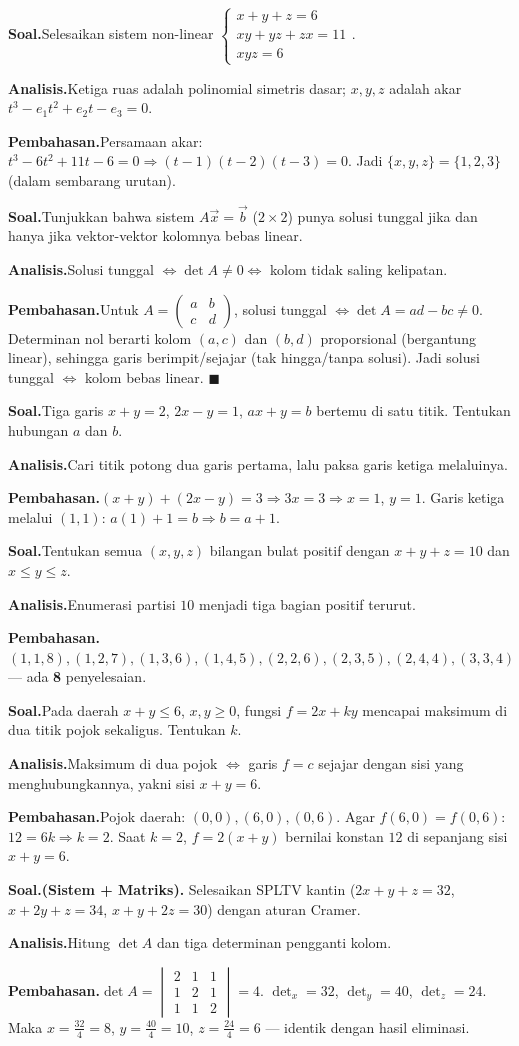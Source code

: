\documentclass[11pt,a4paper]{report}
\theoremstyle{gaya}
\newcommand{\knomor}[1]{\par\medskip\noindent{\bfseries\color{ungu}#1}\par\nopagebreak}
\newcommand{\ksoal}{\noindent\textbf{\color{biru}Soal.}\space}
\newcommand{\kanalisis}{\par\noindent\textbf{\color{oranye}Analisis.}\space}
\newcommand{\kbahas}{\par\noindent\textbf{\color{hijau}Pembahasan.}\space}
\newcommand{\kbagian}[1]{\par\medskip\noindent{\large\bfseries\color{biru}#1}\par\smallskip}
\begin{document}
\kbagian{Bagian C}

\knomor{C.1}
\ksoal Selesaikan sistem non-linear $\begin{cases} x+y+z=6\\ xy+yz+zx=11\\ xyz=6\end{cases}$.
\kanalisis Ketiga ruas adalah polinomial simetris dasar; $x,y,z$ adalah akar $t^3-e_1t^2+e_2t-e_3=0$.
\kbahas Persamaan akar: $t^3-6t^2+11t-6=0\Rightarrow(t-1)(t-2)(t-3)=0$. Jadi $\{x,y,z\}=\{1,2,3\}$ (dalam sembarang urutan).

\knomor{C.2}
\ksoal Tunjukkan bahwa sistem $A\vec x=\vec b$ ($2\times2$) punya solusi tunggal jika dan hanya jika vektor-vektor kolomnya bebas linear.
\kanalisis Solusi tunggal $\iff\det A\neq0\iff$ kolom tidak saling kelipatan.
\kbahas Untuk $A=\begin{pmatrix}a&b\\c&d\end{pmatrix}$, solusi tunggal $\iff\det A=ad-bc\neq0$. Determinan nol berarti kolom $(a,c)$ dan $(b,d)$ proporsional (bergantung linear), sehingga garis berimpit/sejajar (tak hingga/tanpa solusi). Jadi solusi tunggal $\iff$ kolom bebas linear. $\blacksquare$

\knomor{C.3}
\ksoal Tiga garis $x+y=2$, $2x-y=1$, $ax+y=b$ bertemu di satu titik. Tentukan hubungan $a$ dan $b$.
\kanalisis Cari titik potong dua garis pertama, lalu paksa garis ketiga melaluinya.
\kbahas $(x+y)+(2x-y)=3\Rightarrow 3x=3\Rightarrow x=1$, $y=1$. Garis ketiga melalui $(1,1)$: $a(1)+1=b\Rightarrow b=a+1.$

\knomor{C.4}
\ksoal Tentukan semua $(x,y,z)$ bilangan bulat positif dengan $x+y+z=10$ dan $x\le y\le z$.
\kanalisis Enumerasi partisi $10$ menjadi tiga bagian positif terurut.
\kbahas $(1,1,8),(1,2,7),(1,3,6),(1,4,5),(2,2,6),(2,3,5),(2,4,4),(3,3,4)$ --- ada \textbf{8} penyelesaian.

\knomor{C.5}
\ksoal Pada daerah $x+y\le6$, $x,y\ge0$, fungsi $f=2x+ky$ mencapai maksimum di dua titik pojok sekaligus. Tentukan $k$.
\kanalisis Maksimum di dua pojok $\iff$ garis $f=c$ sejajar dengan sisi yang menghubungkannya, yakni sisi $x+y=6$.
\kbahas Pojok daerah: $(0,0),(6,0),(0,6)$. Agar $f(6,0)=f(0,6)$: $12=6k\Rightarrow k=2.$ Saat $k=2$, $f=2(x+y)$ bernilai konstan $12$ di sepanjang sisi $x+y=6$.

\kbagian{Bagian D}

\knomor{D.1}
\ksoal \textbf{(Sistem + Matriks).} Selesaikan SPLTV kantin ($2x+y+z=32$, $x+2y+z=34$, $x+y+2z=30$) dengan aturan Cramer.
\kanalisis Hitung $\det A$ dan tiga determinan pengganti kolom.
\kbahas $\det A=\begin{vmatrix}2&1&1\\1&2&1\\1&1&2\end{vmatrix}=4$. $\det_x=32$, $\det_y=40$, $\det_z=24$. Maka $x=\tfrac{32}{4}=8$, $y=\tfrac{40}{4}=10$, $z=\tfrac{24}{4}=6$ --- identik dengan hasil eliminasi.
\end{document}
